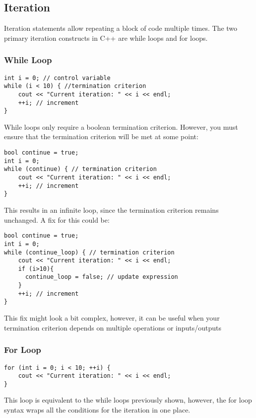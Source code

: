 \documentclass{article}
\begin{document}
\subsection{Iteration}
Iteration statements allow repeating a block of code multiple times. The two primary iteration constructs in C++ are while loops and for loops. 

\subsubsection*{While Loop}

\begin{verbatim}
int i = 0; // control variable
while (i < 10) { //termination criterion
    cout << "Current iteration: " << i << endl;
    ++i; // increment
}
\end{verbatim}

While loops only require a boolean termination criterion. However, you must ensure that the termination criterion will be met at some point:

\begin{verbatim}
bool continue = true; 
int i = 0; 
while (continue) { // termination criterion
    cout << "Current iteration: " << i << endl;
    ++i; // increment
}
\end{verbatim}

This results in an infinite loop, since the termination criterion remains unchanged. A fix for this could be:

\begin{verbatim}
bool continue = true; 
int i = 0; 
while (continue_loop) { // termination criterion
    cout << "Current iteration: " << i << endl;
    if (i>10){
      continue_loop = false; // update expression
    }
    ++i; // increment
}
\end{verbatim}

This fix might look a bit complex, however, it can be useful when your termination criterion depends on multiple operations or inputs/outputs

\subsubsection*{For Loop}
\begin{verbatim}
for (int i = 0; i < 10; ++i) {
    cout << "Current iteration: " << i << endl;
}
\end{verbatim}
This loop is equivalent to the while loops previously shown, however, the for loop syntax wraps all the conditions for the iteration in one place.
\end{document}
